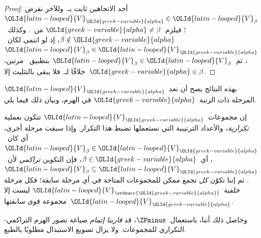 \documentclass[../../../include/open-logic-section]{subfiles}
\begin{document}
\begin{proof}
أحد الاتجاهين ثابت بـ. وللآخر نفرض
${\OLId{latin-looped}{V}}_{\OLId{greek-variable}{alpha}} \in {\OLId{latin-looped}{V}}_\beta$؛ فيلزم~${\OLId{greek-variable}{alpha}} \neq \beta$ من~.
وكذلك~$\beta \notin {\OLId{greek-variable}{alpha}}$، إذ لو انتمى لكان~${\OLId{latin-looped}{V}}_\beta \in {\OLId{latin-looped}{V}}_{\OLId{greek-variable}{alpha}}$،
ثم~${\OLId{latin-looped}{V}}_\beta \in {\OLId{latin-looped}{V}}_\beta$ بتطبيق~ مرتين،
خلافًا لـ. فلا يبقى بالتثليث إلا~${\OLId{greek-variable}{alpha}} \in \beta$.
\end{proof}
\noindent
بهذه النتائج يصح أن نعد~${\OLId{latin-looped}{V}}_{\OLId{greek-variable}{alpha}}$ المرحلة ذات الرتبة~${\OLId{greek-variable}{alpha}}$
في الهرم، وبيان ذلك فيما يلي.

إن مجموعات~${\OLId{latin-looped}{V}}_{\OLId{greek-variable}{alpha}}$ تتكون بعملية \emph{تكرارية}، والأعداد
الترتيبية التي نستعملها تضبط هذا التكرار. وإذا سبقت مرحلة أخرى،
أي كان~${\OLId{latin-looped}{V}}_\beta \in {\OLId{latin-looped}{V}}_{\OLId{greek-variable}{alpha}}$، أي~$\beta \in {\OLId{greek-variable}{alpha}}$، فإن التكوين
\emph{تراكمي} لأن~${\OLId{latin-looped}{V}}_\beta \subseteq {\OLId{latin-looped}{V}}_{\OLId{greek-variable}{alpha}}$. ثم إننا نكوّن
\emph{كل} تجمع ممكن للمجموعات المتاحة في أي مرحلة سابقة؛ فكل مرحلة
خلفية~${\OLId{latin-looped}{V}}_{\ordsucc{{\OLId{greek-variable}{alpha}}}}$ ليست إلا مجموعة قوى سابقتها~${\OLId{latin-looped}{V}}_{\OLId{greek-variable}{alpha}}$.

وحاصل ذلك أننا، باستعمال~$\ZFminus$، قد \emph{قاربنا إتمام} صياغة
تصور الهرم التراكمي-التكراري للمجموعات. ولا يزال تسويغ الاستبدال
مطلوبًا بالطبع.
\end{document}
